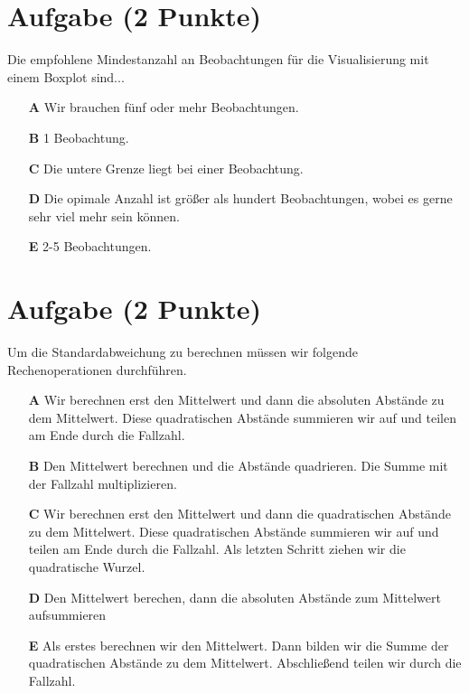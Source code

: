 \documentclass[a4paper, 9pt]{scrartcl}\usepackage[]{graphicx}\usepackage[]{xcolor}
\begin{document}
\section{Aufgabe \hfill (2 Punkte)}



Die empfohlene Mindestanzahl an Beobachtungen für die Visualisierung mit einem Boxplot sind...



\begin{enumerate}
\item [\textbf{A} \msquare] Wir brauchen fünf oder mehr Beobachtungen.
\item [\textbf{B} \msquare] 1 Beobachtung.
\item [\textbf{C} \msquare] Die untere Grenze liegt bei einer Beobachtung.
\item [\textbf{D} \msquare] Die opimale Anzahl ist größer als hundert Beobachtungen, wobei es gerne sehr viel mehr sein können.
\item [\textbf{E} \msquare] 2-5 Beobachtungen.
\end{enumerate}

\section{Aufgabe \hfill (2 Punkte)}



Um die Standardabweichung zu berechnen müssen wir folgende Rechenoperationen durchführen.



\begin{enumerate}
\item [\textbf{A} \msquare] Wir berechnen erst den Mittelwert und dann die absoluten Abstände zu dem Mittelwert. Diese quadratischen Abstände summieren wir auf und teilen am Ende durch die Fallzahl.
\item [\textbf{B} \msquare] Den Mittelwert berechnen und die Abstände quadrieren. Die Summe mit der Fallzahl multiplizieren.
\item [\textbf{C} \msquare] Wir berechnen erst den Mittelwert und dann die quadratischen Abstände zu dem Mittelwert. Diese quadratischen Abstände summieren wir auf und teilen am Ende durch die Fallzahl. Als letzten Schritt ziehen wir die quadratische Wurzel.
\item [\textbf{D} \msquare] Den Mittelwert berechen, dann die absoluten Abstände zum Mittelwert aufsummieren
\item [\textbf{E} \msquare] Als erstes berechnen wir den Mittelwert. Dann bilden wir die Summe der quadratischen Abstände zu dem Mittelwert. Abschließend teilen wir durch die Fallzahl.
\end{enumerate} 
\end{document}
